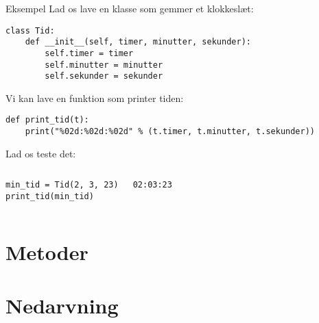 \begin{frame}[fragile]{Eksempel}
	Lad os lave en klasse som gemmer et klokkeslæt:
		\begin{lstlisting}[style=python]
class Tid:
	def __init__(self, timer, minutter, sekunder):
		self.timer = timer
		self.minutter = minutter
		self.sekunder = sekunder
	\end{lstlisting}
	\pause
	Vi kan lave en funktion som printer tiden:
	\begin{lstlisting}[style=python]
def print_tid(t):
	print("%02d:%02d:%02d" % (t.timer, t.minutter, t.sekunder))
	\end{lstlisting}
	\pause
	Lad os teste det:
	\begin{columns}
		\begin{lstlisting}[style=python]
min_tid = Tid(2, 3, 23)
print_tid(min_tid)
		\end{lstlisting}
		\begin{lstlisting}[style=python]
02:03:23
		\end{lstlisting}
	\end{columns}
\end{frame}

\section{Metoder}


\section{Nedarvning}





